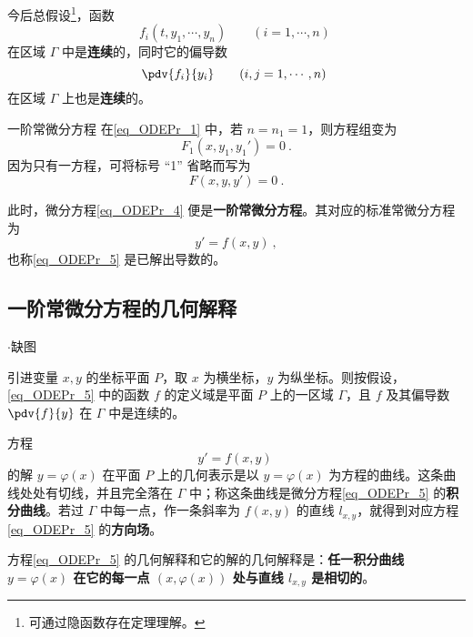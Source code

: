 今后总假设\footnote{可通过隐函数存在定理理解。}，函数 
\begin{equation}
f_i(t,y_1,\cdots,y_n)\qquad (i=1,\cdots,n)~
\end{equation}
在区域 $\Gamma$ 中是\textbf{连续}的，同时它的偏导数
\begin{equation}
\pdv{f_i}{y_i}\qquad (i,j=1,\cdots,n)~
\end{equation}
在区域 $\Gamma$ 上也是\textbf{连续}的。
\begin{example}{一阶常微分方程}
在\autoref{eq_ODEPr_1} 中，若 $n=n_1=1$，则方程组变为
\begin{equation}\label{eq_ODEPr_3}
F_1(x,y_1,y_1')=0~.
\end{equation}
因为只有一方程，可将标号 “1” 省略而写为
\begin{equation}\label{eq_ODEPr_4}
F(x,y,y')=0~.
\end{equation}

此时，微分方程\autoref{eq_ODEPr_4} 便是\textbf{一阶常微分方程}。其对应的标准常微分方程为
\begin{equation}\label{eq_ODEPr_5}
y'=f(x,y)~,
\end{equation}
也称\autoref{eq_ODEPr_5} 是已解出导数的。
\end{example}
\subsection{一阶常微分方程的几何解释}
\begin{issues}
$\cdot$缺图
\end{issues}

引进变量 $x,y$ 的坐标平面 $P$，取 $x$ 为横坐标，$y$ 为纵坐标。则按假设，\autoref{eq_ODEPr_5} 中的函数 $f$ 的定义域是平面 $P$ 上的一区域 $\Gamma$，且 $f$ 及其偏导数 $\pdv{f}{y}$ 在 $\Gamma$ 中是连续的。

方程
\begin{equation}
y'=f(x,y)~
\end{equation}
的解 $y=\varphi(x)$ 在平面 $P$ 上的几何表示是以 $y=\varphi(x)$ 为方程的曲线。这条曲线处处有切线，并且完全落在 $\Gamma$ 中；称这条曲线是微分方程\autoref{eq_ODEPr_5} 的\textbf{积分曲线}。若过 $\Gamma$ 中每一点，作一条斜率为 $f(x,y)$ 的直线 $l_{x,y}$，就得到对应方程\autoref{eq_ODEPr_5} 的\textbf{方向场}。

方程\autoref{eq_ODEPr_5} 的几何解释和它的解的几何解释是：\textbf{任一积分曲线 $y=\varphi(x)$ 在它的每一点 $(x,\varphi(x))$ 处与直线 $l_{x,y}$ 是相切的}。
